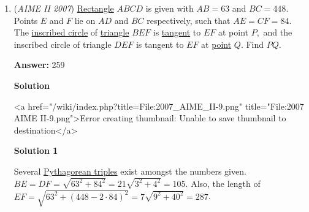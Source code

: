 \begin{enumerate}
 



\textbf{Solution 3 (similar to solution 2)}

Similar to solution 2, we need to maximise the equation $(x-1)(y-1)$. Starting from $x=y=223$, we simply do trial and error, adding $5$ to $x$ while subtracting $4$ from $y$ each time. We notice that the total number of basic squares increases as we increase $x$. 

 Thus, we simply need to find the first value for which the number of basic squares decrease or stay unchanged when we increase $x$, which occurs at $x=258$ and $y=195$, for which the total number of basic squares is $49,858$, which is less than when $x=253$ and $y=199$, which gives $49896$. Thus, our answer is $49896\mod1000 = \boxed{896}$.

 \href{https://mathproblemsolvingskills.wordpress.com/}{MathProblemSolvingSkills.com}

 


 


	\item (\textit{AIME II 2007}) \href{https://artofproblemsolving.com/wiki/index.php?title=Rectangle}{Rectangle} $ABCD$ is given with $AB=63$ and $BC=448.$ Points $E$ and $F$ lie on $AD$ and $BC$ respectively, such that $AE=CF=84.$ The \href{https://artofproblemsolving.com/wiki/index.php?title=Inscribed\_circle}{inscribed circle} of \href{https://artofproblemsolving.com/wiki/index.php?title=Triangle}{triangle} $BEF$ is \href{https://artofproblemsolving.com/wiki/index.php?title=Tangent}{tangent} to $EF$ at point $P,$ and the inscribed circle of triangle $DEF$ is tangent to $EF$ at \href{https://artofproblemsolving.com/wiki/index.php?title=Point}{point} $Q.$ Find $PQ.$

 \textbf{Answer: }259



\textbf{Solution}

<a href="/wiki/index.php?title=File:2007\_AIME\_II-9.png" title="File:2007 AIME II-9.png">Error creating thumbnail: Unable to save thumbnail to destination</a>




\textbf{Solution 1}

Several \href{https://artofproblemsolving.com/wiki/index.php?title=Pythagorean\_triple}{Pythagorean triples} exist amongst the numbers given. $BE = DF = \sqrt{63^2 + 84^2} = 21\sqrt{3^2 + 4^2} = 105$. Also, the length of $EF = \sqrt{63^2 + (448 - 2\cdot84)^2} = 7\sqrt{9^2 + 40^2} = 287$.


\end{enumerate}
